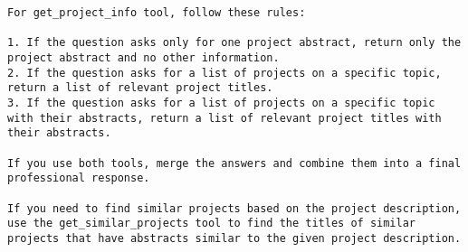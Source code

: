 \begin{lstlisting}
For get_project_info tool, follow these rules:

1. If the question asks only for one project abstract, return only the project abstract and no other information.
2. If the question asks for a list of projects on a specific topic, return a list of relevant project titles.
3. If the question asks for a list of projects on a specific topic with their abstracts, return a list of relevant project titles with their abstracts.

If you use both tools, merge the answers and combine them into a final professional response.

If you need to find similar projects based on the project description, use the get_similar_projects tool to find the titles of similar projects that have abstracts similar to the given project description.
\end{lstlisting}